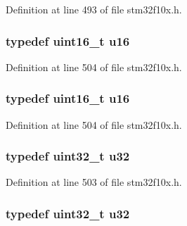 Definition at line 493 of file stm32f10x.\+h.

\subsubsection[{\texorpdfstring{u16}{u16}}]{\setlength{\rightskip}{0pt plus 5cm}typedef {\bf uint16\+\_\+t} {\bf u16}}\hypertarget{group___exported__types_gace9d960e74685e2cd84b36132dbbf8aa}{}\label{group___exported__types_gace9d960e74685e2cd84b36132dbbf8aa}


Definition at line 504 of file stm32f10x.\+h.

\subsubsection[{\texorpdfstring{u16}{u16}}]{\setlength{\rightskip}{0pt plus 5cm}typedef {\bf uint16\+\_\+t} {\bf u16}}\hypertarget{group___exported__types_gace9d960e74685e2cd84b36132dbbf8aa}{}\label{group___exported__types_gace9d960e74685e2cd84b36132dbbf8aa}


Definition at line 504 of file stm32f10x.\+h.

\subsubsection[{\texorpdfstring{u32}{u32}}]{\setlength{\rightskip}{0pt plus 5cm}typedef {\bf uint32\+\_\+t} {\bf u32}}\hypertarget{group___exported__types_gafaa62991928fb9fb18ff0db62a040aba}{}\label{group___exported__types_gafaa62991928fb9fb18ff0db62a040aba}


Definition at line 503 of file stm32f10x.\+h.

\subsubsection[{\texorpdfstring{u32}{u32}}]{\setlength{\rightskip}{0pt plus 5cm}typedef {\bf uint32\+\_\+t} {\bf u32}}\hypertarget{group___exported__types_gafaa62991928fb9fb18ff0db62a040aba}{}\label{group___exported__types_gafaa62991928fb9fb18ff0db62a040aba}


